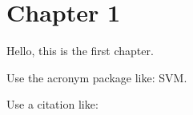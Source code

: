 \chapter{Chapter 1}
\label{ch:chp1}
\acresetall
\graphicspath{{Figures/chp1/}}

Hello, this is the first chapter.

Use the acronym package like: \ac{SVM}.

Use a citation like: \citep{bengioCurriculumLearning2009}